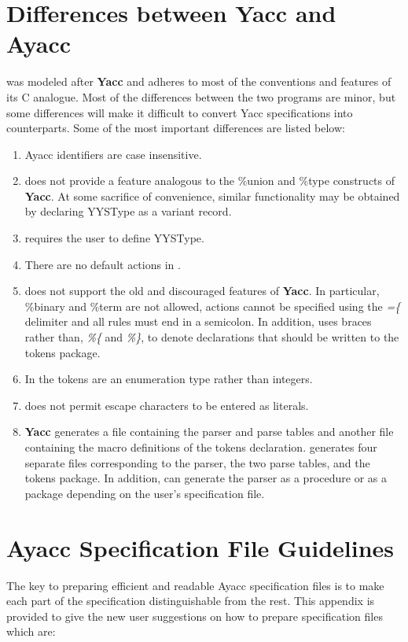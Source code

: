 \section{Differences between Yacc and Ayacc}

\ayacc was modeled after {\bf Yacc} and adheres to most of the conventions and
features of its C analogue.  Most of the differences between the
two programs are minor, but some differences will make it difficult
to convert Yacc specifications into \ayacc
counterparts.  Some of the most important differences
are listed below:

\begin{enumerate}
\item Ayacc identifiers are case insensitive.
\item \ayacc does not provide a feature analogous to the \%union and \%type
constructs of {\bf Yacc}.  At some sacrifice of convenience, similar
functionality may be obtained by declaring YYSType as a
variant record.
\item \ayacc requires the user to define YYSType.
\item There are no default actions in \ayacc.
\item \ayacc does not support the old and discouraged features of {\bf
Yacc}.  In particular, \%binary and \%term are not allowed, actions
cannot be specified using the {\it =\{}
delimiter and all rules must end in a
semicolon.  In addition, \ayacc uses braces rather than,
{\it \%\{} and
{\it \%\}},
to denote declarations that should be written to the tokens package.
\item In \ayacc the tokens are an enumeration type rather than integers.
\item \ayacc does not permit escape characters to be entered as literals.
\item {\bf Yacc} generates a file containing the
parser and parse tables and another file containing the
macro definitions of the tokens declaration.  \ayacc generates four
separate files corresponding to
the parser, the two parse tables, and the tokens package.  In addition,
\ayacc can generate the parser as a procedure
or as a package depending on the user's specification
file.
\end{enumerate}
\newpage
\section{Ayacc Specification File Guidelines}
The key to preparing efficient and readable Ayacc specification files is
to make each part of the specification distinguishable from the rest.  This
appendix is provided to give the new \ayacc user suggestions on how to
prepare specification files which are:

